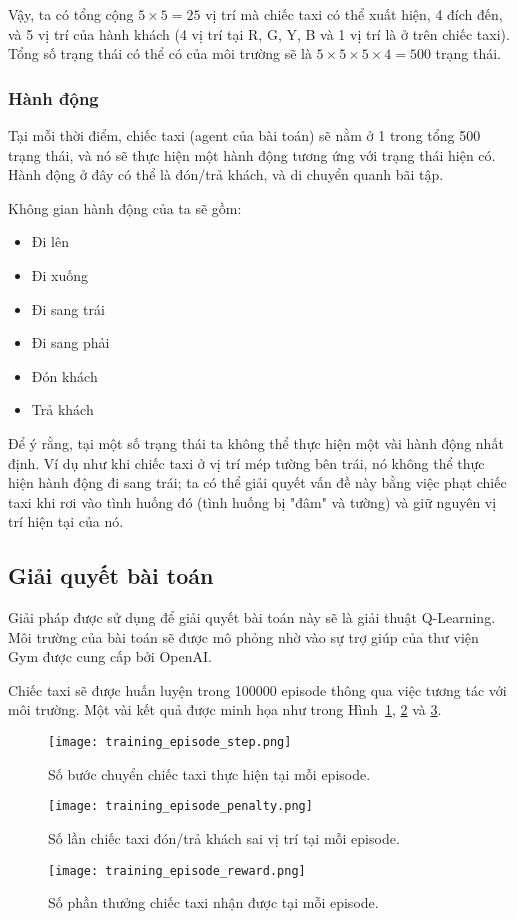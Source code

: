 Vậy, ta có tổng cộng $5 \times 5=25$ vị trí mà chiếc taxi có thể xuất hiện,
4 đích đến, và 5 vị trí của hành khách
(4 vị trí tại R, G, Y, B và 1 vị trí là ở trên chiếc taxi).
Tổng số trạng thái có thể có của môi trường sẽ là
$5 \times 5 \times 5 \times 4=500$ trạng thái.

\subsubsection{Hành động}
Tại mỗi thời điểm, chiếc taxi (agent của bài toán)
sẽ nằm ở 1 trong tổng 500 trạng thái,
và nó sẽ thực hiện một hành động tương ứng với trạng thái hiện có.
Hành động ở đây có thể là đón/trả khách, và di chuyển quanh bãi tập.

Không gian hành động của ta sẽ gồm:
\begin{itemize}
    \item Đi lên
    \item Đi xuống
    \item Đi sang trái
    \item Đi sang phải
    \item Đón khách
    \item Trả khách
\end{itemize}

Để ý rằng, tại một số trạng thái ta không thể thực hiện
một vài hành động nhất định.
Ví dụ như khi chiếc taxi ở vị trí mép tường bên trái,
nó không thể thực hiện hành động đi sang trái;
ta có thể giải quyết vấn đề này bằng việc phạt chiếc taxi
khi rơi vào tình huống đó (tình huống bị "đâm" và tường)
và giữ nguyên vị trí hiện tại của nó.

\subsection{Giải quyết bài toán}
Giải pháp được sử dụng để giải quyết bài toán này
sẽ là giải thuật Q-Learning.
Môi trường của bài toán sẽ được mô phỏng nhờ vào sự trợ giúp
của thư viện Gym được cung cấp bởi OpenAI.

Chiếc taxi sẽ được huấn luyện trong 100000 episode
thông qua việc tương tác với môi trường.
Một vài kết quả được minh họa như trong Hình~\ref{fig:training_episode_step},
\ref{fig:training_episode_penalty} và \ref{fig:training_episode_reward}.

\begin{figure}[H]
    \centering
    \texttt{[image: training\_episode\_step.png]}
    \caption{Số bước chuyển chiếc taxi thực hiện tại mỗi episode.}
    \label{fig:training_episode_step}
\end{figure}
\begin{figure}[H]
    \centering
    \texttt{[image: training\_episode\_penalty.png]}
    \caption{Số lần chiếc taxi đón/trả khách sai vị trí tại mỗi episode.}
    \label{fig:training_episode_penalty}
\end{figure}
\begin{figure}[H]
    \centering
    \texttt{[image: training\_episode\_reward.png]}
    \caption{Số phần thưởng chiếc taxi nhận được tại mỗi episode.}
    \label{fig:training_episode_reward}
\end{figure}

